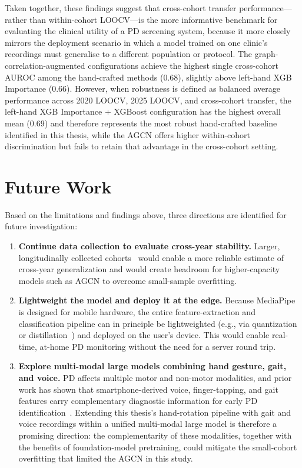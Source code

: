 Taken together, these findings suggest that cross-cohort transfer performance---rather than within-cohort LOOCV---is the more informative benchmark for evaluating the clinical utility of a PD screening system, because it more closely mirrors the deployment scenario in which a model trained on one clinic's recordings must generalise to a different population or protocol. The graph-correlation-augmented configurations achieve the highest single cross-cohort AUROC among the hand-crafted methods ($0.68$), slightly above left-hand XGB Importance ($0.66$). However, when robustness is defined as balanced average performance across 2020 LOOCV, 2025 LOOCV, and cross-cohort transfer, the left-hand XGB Importance + XGBoost configuration has the highest overall mean ($0.69$) and therefore represents the most robust hand-crafted baseline identified in this thesis, while the AGCN offers higher within-cohort discrimination but fails to retain that advantage in the cross-cohort setting.

\section{Future Work}
\label{sec:futurework}

Based on the limitations and findings above, three directions are identified for future investigation:

\begin{enumerate}
    \item \textbf{Continue data collection to evaluate cross-year stability.} Larger, longitudinally collected cohorts~\cite{marek2011ppmi} would enable a more reliable estimate of cross-year generalization and would create headroom for higher-capacity models such as AGCN to overcome small-sample overfitting.

    \item \textbf{Lightweight the model and deploy it at the edge.} Because MediaPipe is designed for mobile hardware, the entire feature-extraction and classification pipeline can in principle be lightweighted (e.g., via quantization or distillation~\cite{jacob2018quantization}) and deployed on the user's device. This would enable real-time, at-home PD monitoring without the need for a server round trip.

    \item \textbf{Explore multi-modal large models combining hand gesture, gait, and voice.} PD affects multiple motor and non-motor modalities, and prior work has shown that smartphone-derived voice, finger-tapping, and gait features carry complementary diagnostic information for early PD identification~\cite{lim2025smartphone}. Extending this thesis's hand-rotation pipeline with gait and voice recordings within a unified multi-modal large model is therefore a promising direction: the complementarity of these modalities, together with the benefits of foundation-model pretraining, could mitigate the small-cohort overfitting that limited the AGCN in this study.
\end{enumerate}
